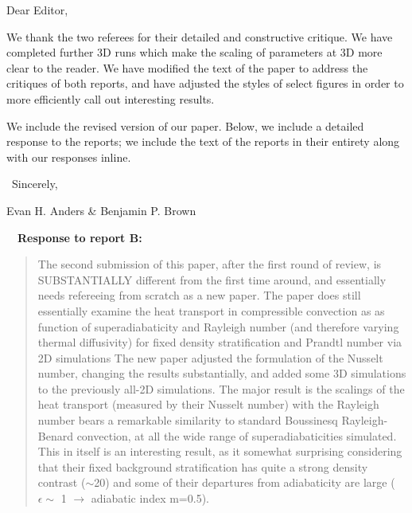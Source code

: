 \documentclass[aps, 11pt, singlecolumn]{revtex4-1} %
\begin{document}
\noindent
Dear Editor,
$\,$\newline

\newenvironment{myquotation}{
\begin{quotation}
\itshape
}{ 
\end{quotation}
}

\begin{singlespace}
We thank the two referees for their detailed and constructive critique.
We have completed further 3D runs which make the scaling of parameters at 3D 
more clear to the reader.
We have modified the text of the paper to address the critiques of
both reports, and have adjusted the styles of select figures in order to
more efficiently call out interesting results.

We include the revised version of our paper.  Below, we include a
detailed response to the reports; we include the text of the reports
in their entirety along with our responses inline.

$\,$\newline
\noindent
Sincerely,

Evan H. Anders \& Benjamin P. Brown




$\,$
\newline
$\,$
\newline
\noindent
\Large{\textbf{Response to report B:}}\newline$\,$\newline\indent

\begin{myquotation}

The second submission of this paper, after the first round of review,
is SUBSTANTIALLY different from the first time around, and essentially
needs refereeing from scratch as a new paper. The paper does still
essentially examine the heat transport in compressible convection as
as function of superadiabaticity and Rayleigh number (and therefore
varying thermal diffusivity) for fixed density stratification and
Prandtl number via 2D simulations The new paper adjusted the
formulation of the Nusselt number, changing the results substantially,
and added some 3D simulations to the previously all-2D simulations.
The major result is the scalings of the heat transport (measured by
their Nusselt number) with the Rayleigh number bears a remarkable
similarity to standard Boussinesq Rayleigh-Benard convection, at all
the wide range of superadiabaticities simulated. This in itself is an
interesting result, as it somewhat surprising considering that their
fixed background stratification has quite a strong density contrast
($\sim$20) and some of their departures from adiabaticity are large
($\epsilon \sim$ 1 $\rightarrow$ adiabatic index m=0.5).


\end{myquotation}
\end{singlespace}
\end{document}
